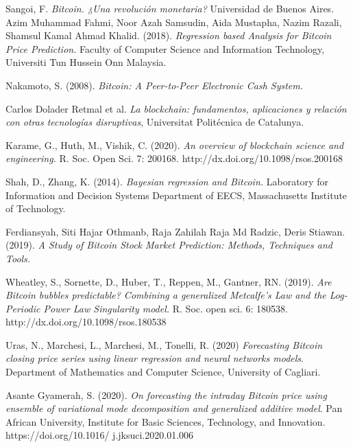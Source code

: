 \documentclass[a4paper,12pt,twocolumn]{article}
\begin{document}
\newpage  
\onecolumn              
%
\begin{thebibliography}{99}

Sangoi, F.
{\em Bitcoin. ¿Una revolución monetaria?}
Universidad de Buenos Aires.
%
Azim Muhammad Fahmi, Noor Azah Samsudin, Aida Mustapha, 
Nazim Razali, Shamsul Kamal Ahmad Khalid. (2018).
{\em Regression based Analysis for Bitcoin Price Prediction.}
Faculty of Computer Science and Information Technology, Universiti Tun Hussein Onn Malaysia.

Nakamoto, S. (2008).
{\em Bitcoin: A Peer-to-Peer Electronic Cash System.}

Carlos Dolader Retmal et al.
{\em La blockchain: fundamentos, aplicaciones y relación con otras tecnologías disruptivas}, Universitat Politécnica de Catalunya.

Karame, G., Huth, M., Vishik, C. (2020).
{\em An overview of blockchain science and
engineering.} R. Soc. Open Sci. 7: 200168.
http://dx.doi.org/10.1098/rsos.200168


Shah, D., Zhang, K. (2014).
{\em Bayesian regression and Bitcoin.} 
Laboratory for Information and Decision Systems
Department of EECS, Massachusetts Institute of Technology.


Ferdiansyah, Siti Hajar Othmanb, Raja Zahilah Raja Md Radzic, Deris Stiawan. (2019).
{\em A Study of Bitcoin Stock Market Prediction: Methods, Techniques and Tools.} 

Wheatley, S., Sornette, D., Huber, T., Reppen, M., Gantner, RN. (2019). 
{\em Are Bitcoin bubbles predictable? Combining a generalized
Metcalfe’s Law and the Log-Periodic Power Law
Singularity model.} R. Soc. open sci. 6: 180538.
http://dx.doi.org/10.1098/rsos.180538

Uras, N., Marchesi, L., Marchesi, M., Tonelli, R. (2020)
{\em Forecasting Bitcoin closing price series using linear
regression and neural networks models}. Department of Mathematics and Computer Science,
University of Cagliari.

Asante Gyamerah, S. (2020).
{\em On forecasting the intraday Bitcoin price using ensemble of variational
mode decomposition and generalized additive model}. Pan African University, Institute for Basic Sciences, Technology, and Innovation.
https://doi.org/10.1016/
j.jksuci.2020.01.006



\end{thebibliography}
\end{document}
